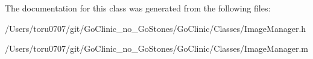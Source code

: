 The documentation for this class was generated from the following files:\begin{DoxyCompactItemize}
\item 
/Users/toru0707/git/GoClinic\_\-no\_\-GoStones/GoClinic/Classes/ImageManager.h\item 
/Users/toru0707/git/GoClinic\_\-no\_\-GoStones/GoClinic/Classes/ImageManager.m\end{DoxyCompactItemize}
